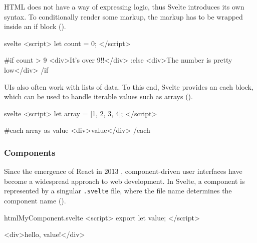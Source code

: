 
HTML does not have a way of expressing logic, thus Svelte introduces its own syntax. To conditionally render some markup, the markup has to be wrapped inside an if block ().

\begin{listing}[H]
\begin{myminted}{svelte}{}
<script>
  let count = 0;
</script>

{#if count > 9}
  <div>It's over 9!!</div>
{:else}
  <div>The number is pretty low</div>
{/if}
\end{myminted}
\caption{Example usage of Svelte's if block.}
\label{fig:svelte-if-syntax} 
\end{listing}

UIs also often work with lists of data. To this end, Svelte provides an each block, which can be used to handle iterable values such as arrays ().

\begin{listing}[H]
\begin{myminted}{svelte}{}
<script>
  let array = [1, 2, 3, 4];
</script>

{#each array as value}
  <div>{value}</div>
{/each}
\end{myminted}
\caption{Example usage of Svelte's each block.}
\label{fig:svelte-array-syntax} 
\end{listing}

\subsubsection{Components}


Since the emergence of React in 2013 \cite{occhino_js_2013}, component-driven user interfaces have become a widespread approach to web development. In Svelte, a component is represented by a singular \texttt{.svelte} file, where the file name determines the component name ().

\begin{listing}[H]
\begin{myminted}{html}{MyComponent.svelte}
<script>
  export let value;
</script>

<div>hello, {value}!</div>
\end{myminted}
\caption{Basic Svelte component that defines the input \texttt{value}.}
\label{fig:svelte-component-basic}
\end{listing}

